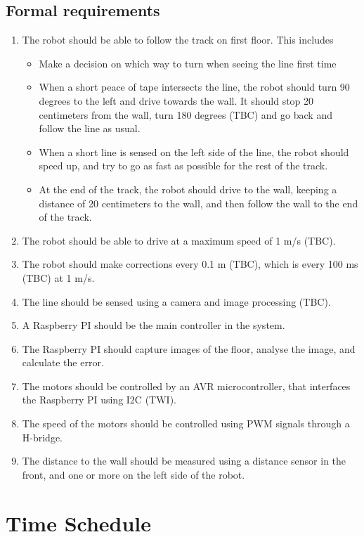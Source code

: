 \subsection{Formal requirements}
\begin{enumerate}
	\item The robot should be able to follow the track on first floor. This includes 
	\begin{itemize}
		\item Make a decision on which way to turn when seeing the line first time
		\item When a short peace of tape intersects the line, the robot should turn 90 degrees to the left
		and drive towards the wall. It should stop 20 centimeters from the wall, turn 180 degrees
		(TBC) and go back and follow the line as usual.
		\item When a short line is sensed on the left side of the line, the robot should speed up, and try to go as fast as possible for the rest of the track.
		\item At the end of the track, the robot should drive to the wall, keeping a distance of 20
		centimeters to the wall, and then follow the wall to the end of the track.
	\end{itemize}
	\item The robot should be able to drive at a maximum speed of 1 m/s (TBC).
	\item The robot should make corrections every 0.1 m (TBC), which is every 100 ms (TBC) at 1 m/s.
	\item The line should be sensed using a camera and image processing (TBC).
	\item A Raspberry PI should be the main controller in the system.
	\item The Raspberry PI should capture images of the floor, analyse the image, and calculate the error.
	\item The motors should be controlled by an AVR microcontroller, that interfaces the Raspberry PI
	using I2C (TWI).
	\item The speed of the motors should be controlled using PWM signals through a H-bridge.
	\item The distance to the wall should be measured using a distance sensor in the front, and one or more on the
	left side of the robot.
\end{enumerate}



\section{Time Schedule}

